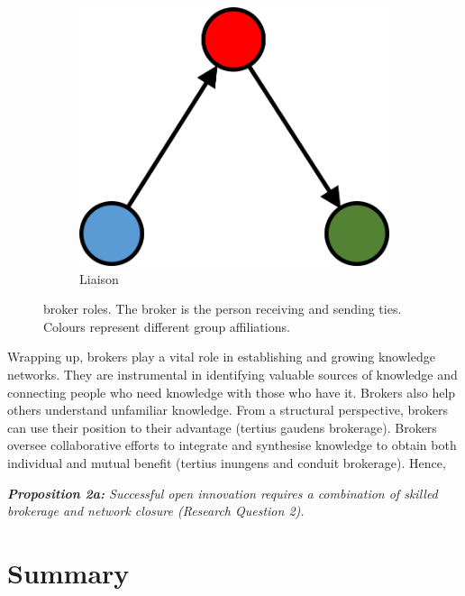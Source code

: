 \begin{figure}
  \hspace{2em}
  \begin{subfigure}[b]{0.25\textwidth}
    \includegraphics[width=\textwidth]{Images/b_O.png}
    \caption{Liaison}
    \label{fig:5}
  \end{subfigure}
  \caption[Broker roles]{\citet{gould1989structures} broker roles. The broker is the person receiving and sending ties. Colours represent different group affiliations.}%
    \label{fig:gf_roles}%
\end{figure}

Wrapping up, brokers play a vital role in establishing and growing knowledge networks. They are instrumental in identifying valuable sources of knowledge and connecting people who need knowledge with those who have it. Brokers also help others understand unfamiliar knowledge. From a structural perspective, brokers can use their position to their advantage (tertius gaudens brokerage). Brokers oversee collaborative efforts to integrate and synthesise knowledge to obtain both individual and mutual benefit (tertius inungens and conduit brokerage). Hence, \bigskip  

\begin{tcolorbox}
\textit{\textbf{Proposition 2a:} Successful open innovation requires a combination of skilled brokerage and network closure (Research Question 2).}
\end{tcolorbox}

\section{Summary}

